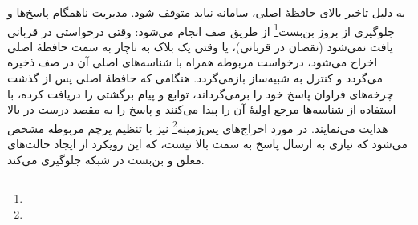 به دلیل تاخیر بالای حافظهٔ اصلی، سامانه نباید متوقف شود. مدیریت ناهمگام پاسخ‌ها و جلوگیری از بروز بن‌بست\footnote{} از طریق صف  انجام می‌شود:
وقتی درخواستی در قربانی یافت نمی‌شود (نقصان در قربانی)، یا وقتی یک بلاک به ناچار به سمت حافظهٔ اصلی اخراج می‌شود، درخواست مربوطه همراه با شناسه‌های اصلی آن در صف  ذخیره می‌گردد و کنترل به شبیه‌ساز بازمی‌گردد. هنگامی که حافظهٔ اصلی پس از گذشت چرخه‌های فراوان پاسخ خود را برمی‌گرداند، توابع  و  پیام برگشتی را دریافت کرده، با استفاده از شناسه‌ها مرجع اولیهٔ آن را پیدا می‌کنند و پاسخ را به مقصد درست در بالا هدایت می‌نمایند. در مورد اخراج‌های پس‌زمینه\footnote{} نیز با تنظیم پرچم مربوطه مشخص می‌شود که نیازی به ارسال پاسخ به سمت بالا نیست، که این رویکرد از ایجاد حالت‌های معلق و بن‌بست در شبکه جلوگیری می‌کند.